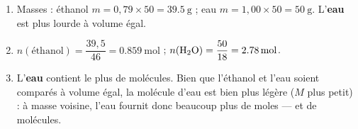 \documentclass[11pt,a4paper]{article}
\begin{document}
\begin{corrige}
\begin{enumerate}[label=\alph*)]
  \item Masses : éthanol $m = 0{,}79\times 50 = \SI{39.5}{\gram}$ ; eau $m = 1{,}00\times 50 = \SI{50}{\gram}$.
        L'\textbf{eau} est plus lourde à volume égal.
  \item $n(\text{éthanol}) = \dfrac{39{,}5}{46} = \SI{0.859}{\mole}$ ; $n(\ce{H2O}) = \dfrac{50}{18} = \SI{2.78}{\mole}$.
  \item L'\textbf{eau} contient le plus de molécules. Bien que l'éthanol et l'eau soient comparés à
        volume égal, la molécule d'eau est bien plus légère ($M$ plus petit) : à masse voisine, l'eau
        fournit donc beaucoup plus de moles — et de molécules.
\end{enumerate}
\end{corrige}
\end{document}
